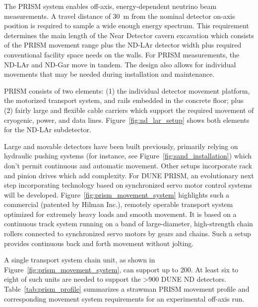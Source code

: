 The PRISM system enables off-axis, energy-dependent neutrino beam measurements. A travel distance of \SI{30}{\m} from the nominal detector on-axis position is required to sample a wide enough energy spectrum. This requirement determines the main length of the Near Detector cavern excavation which consists of the PRISM movement range plus the ND-LAr detector width plus required conventional facility space needs on the walls. For PRISM measurements, the ND-LAr and ND-Gar move in tandem. The design also allows for individual movements that may be needed during installation and maintenance.

PRISM consists of two elements: (1) the individual detector movement platform, the motorized transport system, and rails embedded in the concrete floor; plus (2) fairly large and flexible cable carriers which support the required movement of cryogenic, power, and data lines. Figure~\ref{fig:nd_lar_setup} shows both elements for the ND-LAr subdetector.

Large and movable detectors have been built previously, primarily relying on hydraulic pushing systems (for instance, see Figure~\ref{fig:sand_installation}) which don’t permit continuous and automatic movement. Other setups incorporate rack and pinion drives which add complexity. For DUNE PRISM, an evolutionary next step incorporating  technology based on synchronized servo motor control systems will be developed. Figure~\ref{fig:prism_movement_system} highlights such a commercial (patented by Hilman Inc.), remotely operable transport system optimized for extremely heavy loads and smooth movement. It is based on a continuous track system running on a band of large-diameter, high-strength chain rollers connected to synchronized servo motors by gears and chains. Such a setup provides continuous back and forth movement without jolting.

A single transport system chain unit, as shown in Figure~\ref{fig:prism_movement_system}, can support up to \SI{200}{\metricton}. At least six to eight of such units are needed to support the >\SI{900}{\metricton} DUNE ND  detectors. Table~\ref{tab:prism_profile} summarizes a strawman PRISM movement profile and corresponding movement system requirements for an experimental off-axis run.

